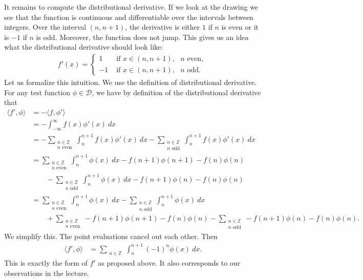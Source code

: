 \documentclass[11pt]{article}
\begin{document}
\begin{solution}
    It remains to compute the distributional derivative. 
    If we look at the drawing we see that the function is continuous and differentiable over the intervals between integers. 
    Over the interval $(n,n+1)$, the derivative is either $1$ if $n$ is even or it is $-1$ if $n$ is odd. 
    Moreover, the function does not jump. 
    This gives us an idea what the distributional derivative should look like:
    \begin{align}
        f'(x) = \begin{cases}
                 1 & \text{ if } x \in (n,n+1), \text{ $n$ even, } 
                 \\
                -1 & \text{ if } x \in (n,n+1), \text{ $n$ odd. } 
               \end{cases}
    \end{align}
    Let us formalize this intuition. We use the definition of distributional derivative. 
    For any test function $\phi \in \mathcal{D}$, 
    we have by definition of the distributional derivative that
    \begin{align*}
        \langle f', \phi \rangle 
        &
        = 
        - \langle f, \phi' \rangle 
        \\&
        = 
        - \int_{-\infty}^{\infty} f(x) \phi'(x) \ dx 
        \\&
        = 
        - 
        \sum_{\substack{n \in \mathbb{Z}\\ n \text{ even}}} \int_{n}^{n+1} f(x) \phi'(x) \ dx
        -
        \sum_{\substack{n \in \mathbb{Z}\\ n \text{ odd} }} \int_{n}^{n+1} f(x) \phi'(x) \ dx
        \\&
        = 
        \sum_{\substack{n \in \mathbb{Z}\\ n \text{ even}}} \int_{n}^{n+1} \phi(x) \ dx - f(n+1)\phi(n+1) - f(n)\phi(n)
        \\&\qquad 
        -
        \sum_{\substack{n \in \mathbb{Z}\\ n \text{ odd} }} \int_{n}^{n+1} \phi(x) \ dx - f(n+1)\phi(n  ) - f(n)\phi(n)
        \\&
        = 
        \sum_{\substack{n \in \mathbb{Z}\\ n \text{ even}}} \int_{n}^{n+1} \phi(x) \ dx
        -
        \sum_{\substack{n \in \mathbb{Z}\\ n \text{ odd} }} \int_{n}^{n+1} \phi(x) \ dx
        \\&\qquad 
        +
        \sum_{\substack{n \in \mathbb{Z}\\ n \text{ even}}} - f(n+1)\phi(n+1) - f(n)\phi(n) 
        -
        \sum_{\substack{n \in \mathbb{Z}\\ n \text{ odd} }} - f(n+1)\phi(n  ) - f(n)\phi(n) 
        .
    \end{align*}
    We simplify this. The point evaluations cancel out each other.
    Then 
    \begin{align}
        \langle f', \phi \rangle 
        &
        = 
        \sum_{\substack{n \in \mathbb{Z} }} \int_{n}^{n+1} (-1)^{n} \phi(x) \ dx
        .
    \end{align}
    This is exactly the form of $f'$ as proposed above. It also corresponds to our observations in the lecture. 


\end{solution}
\end{document}
